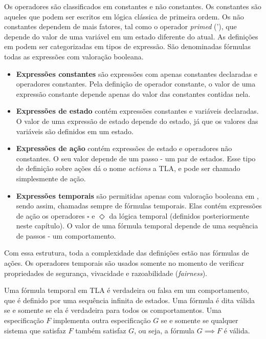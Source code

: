 Os operadores são classificados em constantes e não constantes. Os constantes são aqueles que podem ser escritos em lógica clássica de primeira ordem. Os não constantes dependem de mais fatores, tal como o operador \textit{primed} ('), que depende do valor de uma variável em um estado diferente do atual. As definições em \TLA podem ser categorizadas em tipos de expressão. São denominadas fórmulas todas as expressões com valoração booleana.
\begin{itemize}
  \item \textbf{Expressões constantes} são expressões com apenas constantes declaradas e operadores constantes. Pela definição de operador constante, o valor de uma expressão constante depende apenas do valor das constantes contidas nela.
  \item \textbf{Expressões de estado} contém expressões constantes e variáveis declaradas. O valor de uma expressão de estado depende do estado, já que os valores das variáveis são definidos em um estado.
  \item \textbf{Expressões de ação} contém expressões de estado e operadores não constantes. O seu valor depende de um passo - um par de estados. Esse tipo de definição sobre ações dá o nome \textit{actions} a TLA, e pode ser chamado simplesmente de ação.
  \item \textbf{Expressões temporais} são permitidas apenas com valoração booleana em \TLA, sendo assim, chamadas sempre de fórmulas temporais. Elas contém expressões de ação os operadores $\square$ e $\Diamond$ da lógica temporal (definidos posteriormente neste capítulo). O valor de uma fórmula temporal depende de uma sequência de passos - um comportamento.
\end{itemize}

Com essa estrutura, toda a complexidade das definições estão nas fórmulas de ações. Os operadores temporais são usados somente no momento de verificar propriedades de segurança, vivacidade e razoabilidade (\textit{fairness}).

Uma fórmula temporal em TLA é verdadeira ou falsa em um comportamento, que é definido por uma sequência infinita de estados. Uma fórmula é dita válida se e somente se ela é verdadeira para todos os comportamentos. Uma especificação $F$ implementa outra especificação $G$ se e somente se qualquer sistema que satisfaz $F$ também satisfaz $G$, ou seja, a fórmula $G \implies F$ é válida.

